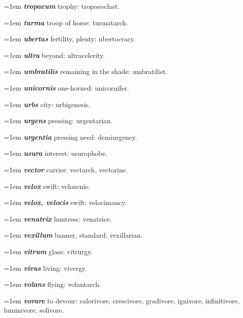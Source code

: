 \hangindent=1em \textbf{\textit{tropaeum}} trophy: tropaeoclast.\par
\hangindent=1em \textbf{\textit{turma}} troop of horse: turmatarch.\par
\hangindent=1em \textbf{\textit{ubertas}} fertility, plenty: ubertocracy.\par
\hangindent=1em \textbf{\textit{ultra}} beyond: ultracelerity.\par
\hangindent=1em \textbf{\textit{umbratilis}} remaining in the shade: umbratilist.\par
\hangindent=1em \textbf{\textit{unicornis}} one-horned: unicornifer.\par
\hangindent=1em \textbf{\textit{urbs}} city: urbigenesis.\par
\hangindent=1em \textbf{\textit{urgens}} pressing: urgentarian.\par
\hangindent=1em \textbf{\textit{urgentia}} pressing need: demiurgency.\par
\hangindent=1em \textbf{\textit{usura}} interest: usurophobe.\par
\hangindent=1em \textbf{\textit{vector}} carrier: vectarch, vectorine.\par
\hangindent=1em \textbf{\textit{velox}} swift: veloxenie.\par
\hangindent=1em \textbf{\textit{velox, velocis}} swift: velocimancy.\par
\hangindent=1em \textbf{\textit{venatrix}} huntress: venatrice.\par
\hangindent=1em \textbf{\textit{vexillum}} banner, standard: vexillarian.\par
\hangindent=1em \textbf{\textit{vitrum}} glass: vitrurgy.\par
\hangindent=1em \textbf{\textit{vivus}} living: vivergy.\par
\hangindent=1em \textbf{\textit{volans}} flying: volantarch.\par
\hangindent=1em \textbf{\textit{vorare}} to devour: calorivore, crescivore, gradivore, ignivore, infinitivore, luminivore, solivore.\par
